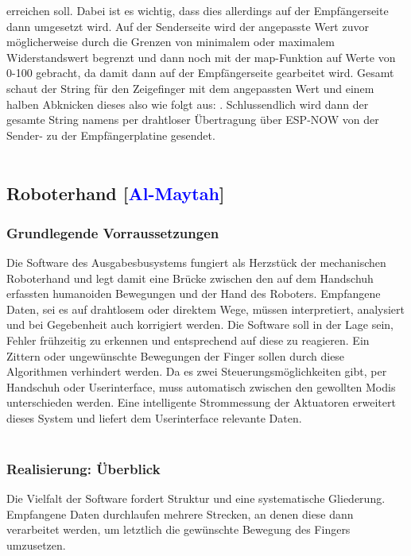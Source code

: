 \documentclass[titlepage,12pt,twoside]{article}
\begin{document}
erreichen soll. Dabei ist es wichtig, dass dies allerdings auf der Empfängerseite 
dann umgesetzt wird. Auf der Senderseite wird der angepasste Wert zuvor 
möglicherweise durch die Grenzen von minimalem oder maximalem Widerstandswert 
begrenzt und dann noch mit der map-Funktion auf Werte von 0-100 gebracht, da damit 
dann auf der Empfängerseite gearbeitet wird. Gesamt schaut der String für den 
Zeigefinger mit dem angepassten Wert und einem halben Abknicken dieses also wie 
folgt aus: . Schlussendlich wird dann der gesamte String namens 
 per drahtloser Übertragung über ESP-NOW von der Sender- zu der 
Empfängerplatine gesendet. \\
\\

\newpage
\subsection{Roboterhand [\textcolor{blue}{Al-Maytah}]}

\subsubsection{Grundlegende Vorraussetzungen}
Die Software des Ausgabesbusystems fungiert als Herzstück der mechanischen Roboterhand und legt damit eine Brücke zwischen den auf dem Handschuh erfassten 
humanoiden Bewegungen und der Hand des Roboters. Empfangene Daten, sei es auf drahtlosem oder direktem Wege, müssen interpretiert, analysiert und bei 
Gegebenheit auch korrigiert werden. Die Software soll in der Lage sein, Fehler frühzeitig zu erkennen und entsprechend auf diese zu reagieren. Ein Zittern 
oder ungewünschte Bewegungen der Finger sollen durch diese Algorithmen verhindert werden. Da es zwei Steuerungsmöglichkeiten gibt, per Handschuh oder 
Userinterface, muss automatisch zwischen den gewollten Modis unterschieden werden. Eine intelligente Strommessung der Aktuatoren erweitert dieses 
System und liefert dem Userinterface relevante Daten. \\
\\

\subsubsection{Realisierung: Überblick}
\label{chap:Realisierung: Überblick}
Die Vielfalt der Software fordert Struktur und eine systematische Gliederung. Empfangene Daten durchlaufen mehrere Strecken, an denen diese dann 
verarbeitet werden, um letztlich die gewünschte Bewegung des Fingers umzusetzen. \\
\\
\newpage
\end{document}
